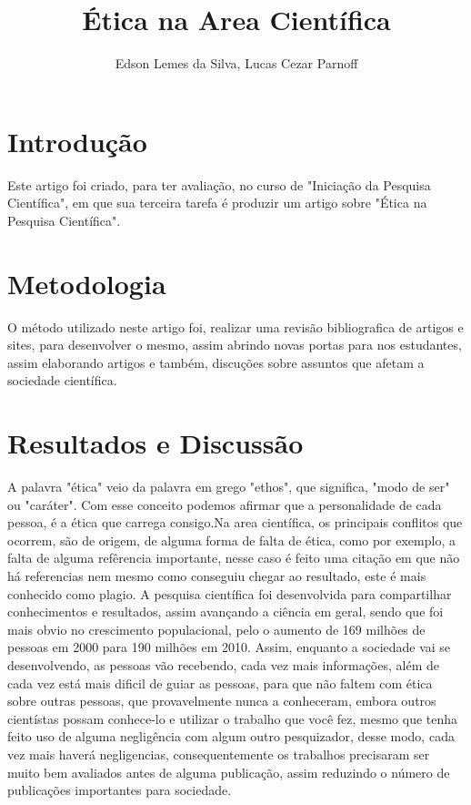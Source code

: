 \documentclass[12pt]{article}
\title{Ética na Area Cientí­fica}
\author{Edson Lemes da Silva, Lucas Cezar Parnoff}
\begin{document}
 

\maketitle

\begin{abstract}
  
\end{abstract}
     
\begin{resumo} 
  
\end{resumo}


\section{Introdução}\label{sec:introducao}
Este artigo foi criado, para ter avaliação,
no curso de "Iniciação da Pesquisa Científica",
em que sua terceira tarefa é produzir um artigo
sobre "Ética na Pesquisa Científica".
\section{Metodologia} \label{sec:desenvolv}
O método utilizado neste artigo foi, realizar uma 
revisão bibliografica de artigos e sites, 
para desenvolver o mesmo, assim abrindo novas portas
para nos estudantes, assim elaborando artigos e
também, discuções sobre assuntos que afetam a 
sociedade científica.  
\section{Resultados e Discussão}\label{sec:resuldisc}
A palavra "ética" veio da palavra em grego "ethos", que
significa, "modo de ser" ou "caráter"\cite{signi:etmo}.
Com esse conceito podemos afirmar que a personalidade de
cada pessoa, é a ética que carrega consigo.Na area
científica, os principais conflitos que ocorrem, são
de origem, de alguma forma de falta de ética, como por 
exemplo, a falta de alguma refêrencia importante, nesse 
caso é feito uma citação em que não há referencias nem 
mesmo como conseguiu chegar ao resultado, este é mais 
conhecido como plagio.
A pesquisa científica foi desenvolvida para compartilhar 
conhecimentos e resultados, assim avançando a ciência 
em geral, sendo que foi mais obvio no crescimento 
populacional, pelo o aumento de 169 milhões de pessoas 
em 2000\cite{censo:00} para 190 milhões em 2010\cite{censo:10}.
Assim, enquanto a sociedade vai se desenvolvendo,
as pessoas vão recebendo, cada vez mais informações,
além de cada vez está mais dificil de guiar as
pessoas, para que não faltem com ética sobre 
outras pessoas, que provavelmente nunca a conheceram,
embora outros cientístas possam conhece-lo e utilizar
o trabalho que você fez, mesmo que tenha
feito uso de alguma negligência com algum outro 
pesquizador, desse modo, cada vez mais haverá
negligencias, consequentemente os
trabalhos precisaram ser muito bem avaliados
antes de alguma publicação, assim reduzindo
o número de publicações importantes para 
sociedade.




 



\end{document}

